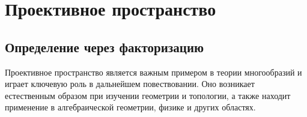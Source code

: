 
\section{Проективное пространство}
\subsection{Определение через факторизацию}
    





Проективное пространство является важным примером в теории многообразий и играет ключевую роль в дальнейшем повествовании. Оно возникает естественным образом при изучении геометрии и топологии, а также находит применение в алгебраической геометрии, физике и других областях.


